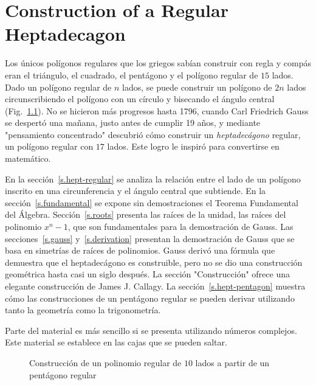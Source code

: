 
\chapter{Construction of a Regular Heptadecagon}\label{c.heptadecagon}


Los únicos polígonos regulares que los griegos sabían construir con regla y compás eran el triángulo, el cuadrado, el pentágono y el polígono regular de $15$ lados. Dado un polígono regular de $n$ lados, se puede construir un polígono de $2n$ lados circunscribiendo el polígono con un círculo y bisecando el ángulo central (Fig.~\ref{f.hept-double}). No se hicieron más progresos hasta 1796, cuando Carl Friedrich Gauss se despertó una mañana, justo antes de cumplir 19 años, y mediante "pensamiento concentrado" descubrió cómo construir un \emph{heptadecágono} regular, un polígono regular con $17$ lados. Este logro le inspiró para convertirse en matemático.

En la sección~\ref{s.hept-regular} se analiza la relación entre el lado de un polígono inscrito en una circunferencia y el ángulo central que subtiende. En la sección~\ref{s.fundamental} se expone sin demostraciones el Teorema Fundamental del Álgebra. Sección~\ref{s.roots} presenta las raíces de la unidad, las raíces del polinomio $x^n-1$, que son fundamentales para la demostración de Gauss. Las secciones~\ref{s.gauss} y~\ref{s.derivation} presentan la demostración de Gauss que se basa en simetrías de raíces de polinomios. Gauss derivó una fórmula que demuestra que el heptadecágono es construible, pero no se dio una construcción geométrica hasta casi un siglo después. La sección "Construcción" ofrece una elegante construcción de James J. Callagy. La sección~\ref{s.hept-pentagon} muestra cómo las construcciones de un pentágono regular se pueden derivar utilizando tanto la geometría como la trigonometría.

Parte del material es más sencillo si se presenta utilizando números complejos. Este material se establece en las cajas que se pueden saltar.
\begin{figure}[b]
\begin{center}
\end{center}
\caption{Construcción de un polinomio regular de $10$ lados a partir de un pentágono regular}\label{f.hept-double}
\end{figure}

